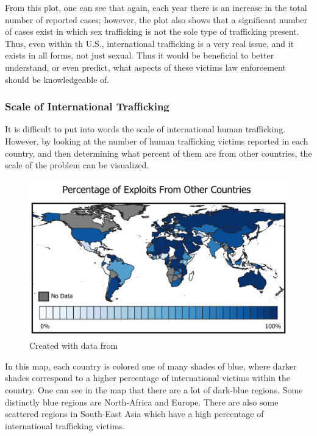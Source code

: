 \documentclass{article} %
\begin{document}
\FloatBarrier

From this plot, one can see that again, each year there is an increase in the total number of reported cases; however, the plot also shows that a significant number of cases exist in which sex trafficking is not the sole type of trafficking present. Thus, even within th U.S., international trafficking is a very real issue, and it exists in all forms, not just sexual. Thus it would be beneficial to better understand, or even predict, what aspects of these victims law enforcement should be knowledgeable of. 

\subsubsection*{Scale of International Trafficking}

It is difficult to put into words the scale of international human trafficking. However, by looking at the number of human trafficking victims reported in each country, and then determining what percent of them are from other countries, the scale of the problem can be visualized.

\FloatBarrier

\begin{center}
	\begin{figure}[H]
		\includegraphics[width = \textwidth]{ProposalMap1}
		\scriptsize{\caption{Created with data from \cite{CTDC}}}
	\end{figure}
\end{center}
\FloatBarrier

In this map, each country is colored one of many shades of blue, where darker shades correspond to a higher percentage of international victims within the country. One can see in the map that there are a lot of dark-blue regions. Some distinctly blue regions are North-Africa and Europe. There are also some scattered regions in South-East Asia which have a high percentage of international trafficking victims. 
\end{document}
